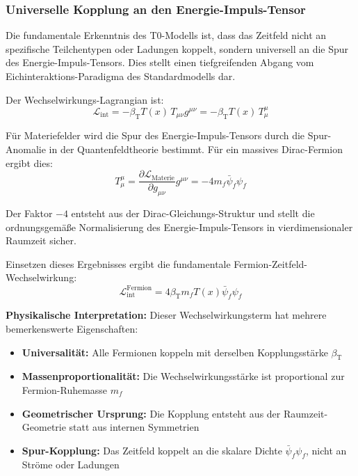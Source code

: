 \documentclass[12pt,a4paper]{article}
\newcommand{\Tfield}{T(x)}
\newcommand{\betaT}{\beta_{\text{T}}}
\begin{document}
	\subsubsection{Universelle Kopplung an den Energie-Impuls-Tensor}
	
	Die fundamentale Erkenntnis des T0-Modells ist, dass das Zeitfeld nicht an spezifische Teilchentypen oder Ladungen koppelt, sondern universell an die Spur des Energie-Impuls-Tensors. Dies stellt einen tiefgreifenden Abgang vom Eichinteraktions-Paradigma des Standardmodells dar.
	
	Der Wechselwirkungs-Lagrangian ist:
	\begin{equation}
		\mathcal{L}_{\text{int}} = -\betaT \Tfield \, T_{\mu\nu} g^{\mu\nu} = -\betaT \Tfield \, T^{\mu}_{\mu}
	\end{equation}
	
	Für Materiefelder wird die Spur des Energie-Impuls-Tensors durch die Spur-Anomalie in der Quantenfeldtheorie bestimmt. Für ein massives Dirac-Fermion ergibt dies:
	\begin{equation}
		T^{\mu}_{\mu} = \frac{\partial \mathcal{L}_{\text{Materie}}}{\partial g_{\mu\nu}} g^{\mu\nu} = -4m_f \bar{\psi}_f \psi_f
	\end{equation}
	
	Der Faktor $-4$ entsteht aus der Dirac-Gleichungs-Struktur und stellt die ordnungsgemäße Normalisierung des Energie-Impuls-Tensors in vierdimensionaler Raumzeit sicher.
	
	Einsetzen dieses Ergebnisses ergibt die fundamentale Fermion-Zeitfeld-Wechselwirkung:
	\begin{equation}
		\mathcal{L}_{\text{int}}^{\text{Fermion}} = 4\betaT m_f \Tfield \bar{\psi}_f \psi_f
	\end{equation}
	
	\textbf{Physikalische Interpretation:} Dieser Wechselwirkungsterm hat mehrere bemerkenswerte Eigenschaften:
	\begin{itemize}
		\item \textbf{Universalität:} Alle Fermionen koppeln mit derselben Kopplungsstärke $\betaT$
		\item \textbf{Massenproportionalität:} Die Wechselwirkungsstärke ist proportional zur Fermion-Ruhemasse $m_f$
		\item \textbf{Geometrischer Ursprung:} Die Kopplung entsteht aus der Raumzeit-Geometrie statt aus internen Symmetrien
		\item \textbf{Spur-Kopplung:} Das Zeitfeld koppelt an die skalare Dichte $\bar{\psi}_f \psi_f$, nicht an Ströme oder Ladungen
	\end{itemize}
	
\end{document}
